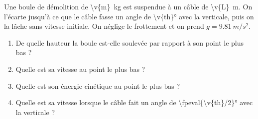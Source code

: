 Une boule de démolition de \qty{\v{m}}{kg} est suspendue à un câble de \qty{\v{L}}{m}. On l'écarte jusqu'à ce que le câble fasse un angle de \ang{\v{th}} avec la verticale, puis on la lâche sans vitesse initiale. On néglige le frottement et on prend $g = \qty{9.81}{m/s^2}$.

\begin{enumerate}[label=\alph*)]
    \item De quelle hauteur la boule est-elle soulevée par rapport à son point le plus bas ?
    \item Quelle est sa vitesse au point le plus bas ?
    \item Quelle est son énergie cinétique au point le plus bas ?
    \item Quelle est sa vitesse lorsque le câble fait un angle de \ang{\fpeval{\v{th}/2}} avec la verticale ?
\end{enumerate}
